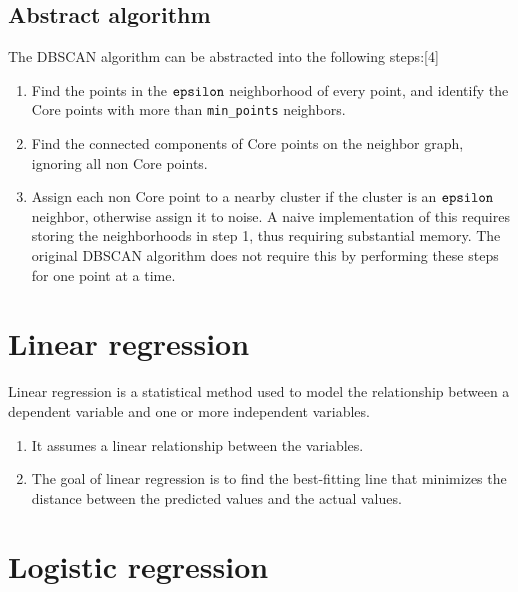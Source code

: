 \documentclass[10pt,a4paper]{book}
\begin{document}
\section{Abstract algorithm}
The DBSCAN algorithm can be abstracted into the following steps:[4]

\begin{enumerate}
\item Find the points in the $\verb-epsilon-$ neighborhood of every point, and identify the Core points with more than \verb-min_points- neighbors.

\item Find the connected components of Core points on the neighbor graph, ignoring all non Core points.

\item Assign each non Core point to a nearby cluster if the cluster is an $\verb-epsilon-$ neighbor, otherwise assign it to noise.
A naive implementation of this requires storing the neighborhoods in step 1, thus requiring substantial memory. The original DBSCAN algorithm does not require this by performing these steps for one point at a time.
\end{enumerate}

\chapter{Linear regression}
    

Linear regression is a statistical method used to model the relationship between a dependent variable and one or more independent variables. 
\begin{enumerate}
\item It assumes a linear relationship between the variables. 
\item The goal of linear regression is to find the best-fitting line that minimizes the distance between the predicted values and the actual values. 
\end{enumerate}
    
\chapter{Logistic regression}
    
\end{document}
